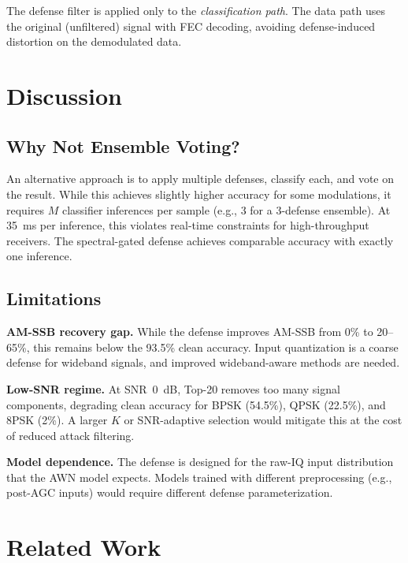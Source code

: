 \documentclass[letterpaper,twocolumn,10pt]{article}
\begin{document}
The defense filter is applied only to the \emph{classification path}.
The data path uses the original (unfiltered) signal with FEC decoding,
avoiding defense-induced distortion on the demodulated data.

\section{Discussion}
\label{sec:discuss}

\subsection{Why Not Ensemble Voting?}

An alternative approach is to apply multiple defenses, classify each,
and vote on the result. While this achieves slightly higher accuracy
for some modulations, it requires $M$ classifier inferences per sample
(e.g., 3 for a 3-defense ensemble). At 35~ms per inference, this
violates real-time constraints for high-throughput receivers. The
spectral-gated defense achieves comparable accuracy with exactly
one inference.

\subsection{Limitations}

\textbf{AM-SSB recovery gap.} While the defense improves AM-SSB from
0\% to 20--65\%, this remains below the 93.5\% clean accuracy. Input
quantization is a coarse defense for wideband signals, and improved
wideband-aware methods are needed.

\textbf{Low-SNR regime.} At SNR~0~dB, Top-20 removes too many
signal components, degrading clean accuracy for BPSK (54.5\%), QPSK
(22.5\%), and 8PSK (2\%). A larger $K$ or SNR-adaptive selection
would mitigate this at the cost of reduced attack filtering.

\textbf{Model dependence.} The defense is designed for the raw-IQ
input distribution that the AWN model expects. Models trained with
different preprocessing (e.g., post-AGC inputs) would require
different defense parameterization.

\section{Related Work}
\label{sec:related}
\end{document}
